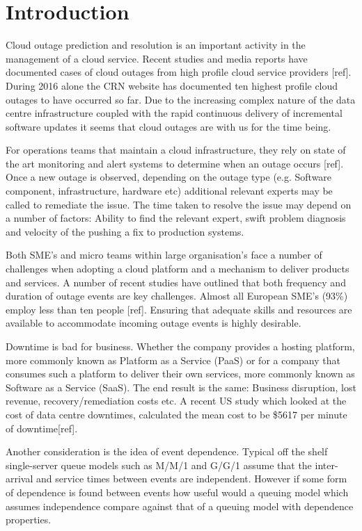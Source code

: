 \documentclass[5p]{elsarticle}
\begin{document}
\linenumbers

\section{Introduction}
Cloud outage prediction and resolution is an important activity in the management of a cloud service. Recent studies and media reports have documented cases of cloud outages from high profile cloud service providers [ref]. During 2016 alone the CRN website has documented ten highest profile cloud outages to have occurred so far.  Due to the increasing complex nature of the data centre infrastructure coupled with the rapid continuous delivery of incremental software updates it seems that cloud outages are with us for the time being.

For operations teams that maintain a cloud infrastructure, they rely on state of the art monitoring and alert systems to determine when an outage occurs [ref]. Once a new outage is observed, depending on the outage type (e.g. Software component, infrastructure, hardware etc) additional relevant experts may be called to remediate the issue. The time taken to resolve the issue may depend on a number of factors: Ability to find the relevant expert, swift problem diagnosis and velocity of the pushing a fix to production systems. 

Both SME's and micro teams within large organisation's face a number of challenges when adopting a cloud platform and a mechanism to deliver products and services. A number of recent studies have outlined that both frequency and duration of outage events are key challenges. Almost all European SME's (93\%) employ less than ten people [ref]. Ensuring that adequate skills and resources are available to accommodate incoming outage events is highly desirable.

Downtime is bad for business. Whether the company provides a hosting platform, more commonly known as Platform as a Service (PaaS) or for a company that consumes such a platform to deliver their own services, more commonly known as Software as a Service (SaaS). The end result is the same: Business disruption, lost revenue, recovery/remediation costs etc. A recent US study which looked at the cost of data centre downtimes, calculated the mean cost to be \$5617 per minute of downtime[ref].

Another consideration is the idea of event dependence. Typical off the shelf single-server queue models such as M/M/1 and G/G/1 assume that the inter-arrival and service times between events are independent. However if some form of dependence is found between events how useful would a queuing model which assumes independence compare against that of a queuing model with dependence properties.
\end{document}
